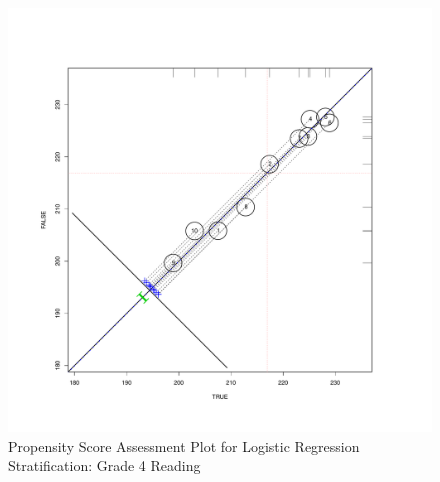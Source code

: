 \begin{figure}[h!]
\begin{center}
\includegraphics[height=.4\textheight,width=.4\textheight]{../Figures2009/g4read-circpsa10.pdf}
\caption{Propensity Score Assessment Plot for Logistic Regression Stratification: Grade 4 Reading}
\end{center}
\end{figure}



